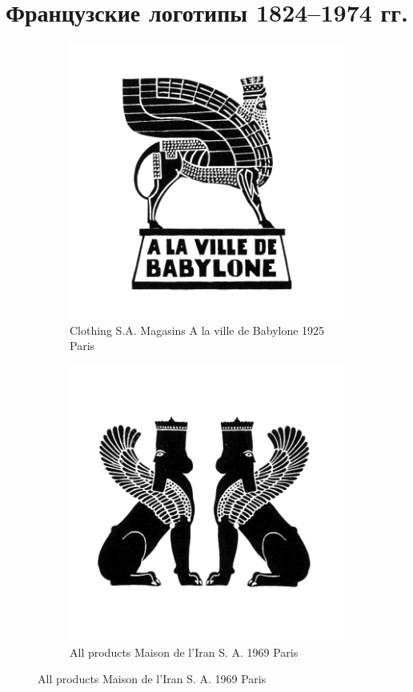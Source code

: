 \section{Французские логотипы 1824--1974 гг.}
\label{app:french-trademarks}

\begin{figure}[h]
  \centering
  \begin{subfigure}{.45\textwidth}
    \centering
    \includegraphics[width=.5\linewidth]{images/supplement/trademarks/french/1_1}
    \caption{Clothing S.A. Magasins A la ville de Babylone 1925 Paris}
    \label{fig:trademarks:french:1.1}
  \end{subfigure}\hfill
  \begin{subfigure}{.45\textwidth}
    \centering
    \includegraphics[width=.5\linewidth]{images/supplement/trademarks/french/1_2}
    \caption{All products Maison de l'Iran S. A. 1969 Paris}
    \label{fig:trademarks:french:1.2}
  \end{subfigure}


\end{figure}
